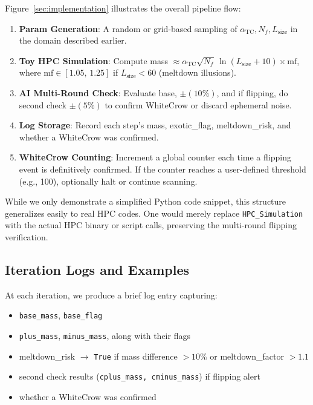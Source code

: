 \documentclass[11pt]{article}
\begin{document}
Figure~\ref{sec:implementation} illustrates the overall pipeline flow:
\begin{enumerate}
\item \textbf{Param Generation}: A random or grid-based sampling
      of $\alpha_{\mathrm{TC}}, N_f, L_{\mathrm{size}}$ in the domain described earlier.
\item \textbf{Toy HPC Simulation}: Compute mass $\approx \alpha_{\mathrm{TC}}\sqrt{N_f}\,\ln(L_{\mathrm{size}}+10)\times \mathrm{mf}$,
      where $\mathrm{mf}\in[1.05,\,1.25]$ if $L_{\mathrm{size}}<60$ (meltdown illusions).
\item \textbf{AI Multi-Round Check}: Evaluate base, $\pm(10\%)$, and
      if flipping, do second check $\pm(5\%)$ to confirm WhiteCrow or discard ephemeral noise.
\item \textbf{Log Storage}: Record each step's mass, exotic\_flag, meltdown\_risk,
      and whether a WhiteCrow was confirmed.
\item \textbf{WhiteCrow Counting}: Increment a global counter each time
      a flipping event is definitively confirmed. If the counter reaches a user-defined threshold
      (e.g., 100), optionally halt or continue scanning.
\end{enumerate}

While we only demonstrate a simplified Python code snippet,
this structure generalizes easily to real HPC codes. One would merely replace
\texttt{HPC\_Simulation} with the actual HPC binary or script calls,
preserving the multi-round flipping verification.

\subsection{Iteration Logs and Examples}

At each iteration, we produce a brief log entry capturing:
\begin{itemize}
\item \texttt{base\_mass}, \texttt{base\_flag}
\item \texttt{plus\_mass}, \texttt{minus\_mass}, along with their flags
\item meltdown\_risk $\rightarrow$ \texttt{True} if mass difference $> 10\%$ or meltdown\_factor $>1.1$
\item second check results (\texttt{cplus\_mass, cminus\_mass}) if flipping alert
\item whether a WhiteCrow was confirmed
\end{itemize}
\end{document}
